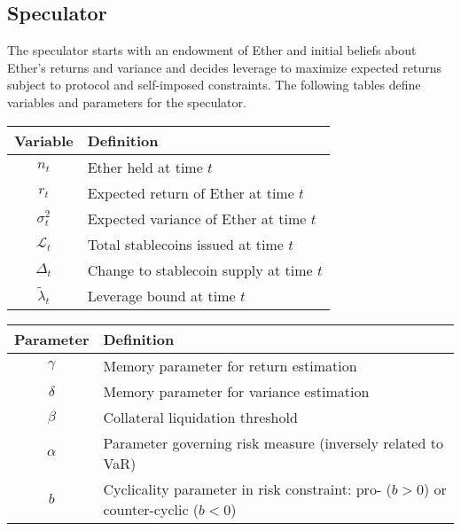 \subsection{Speculator}
The speculator starts with an endowment of Ether and initial beliefs about Ether's returns and variance and decides leverage to maximize expected returns subject to protocol and self-imposed constraints. The following tables define variables and parameters for the speculator.
\begin{center}
	\begin{tabular}{c|l}
		\textbf{Variable}	&	\textbf{Definition} \\
		\hline
		$n_t$		&	Ether held at time $t$ \\
		$r_t$		&	Expected return of Ether at time $t$ \\
		$\sigma^2_t$	&	Expected variance of Ether at time $t$ \\
		$\mathcal{L}_t$		&	Total stablecoins issued at time $t$ \\
		$\Delta_t$	&	Change to stablecoin supply at time $t$ \\
		$\tilde\lambda_t$	&	Leverage bound at time $t$
	\end{tabular}
\end{center}
\begin{center}
	\begin{tabular}{c|l}
		\textbf{Parameter}	&	\textbf{Definition} \\
		\hline
		$\gamma$	&	Memory parameter for return estimation \\
		$\delta$	&	Memory parameter for variance estimation \\
		$\beta$		&	Collateral liquidation threshold \\
		$\alpha$	&	Parameter governing risk measure (inversely related to VaR) \\
		$b$			&	Cyclicality parameter in risk constraint: pro- ($b>0$) or counter-cyclic ($b<0$)
	\end{tabular}
\end{center}


